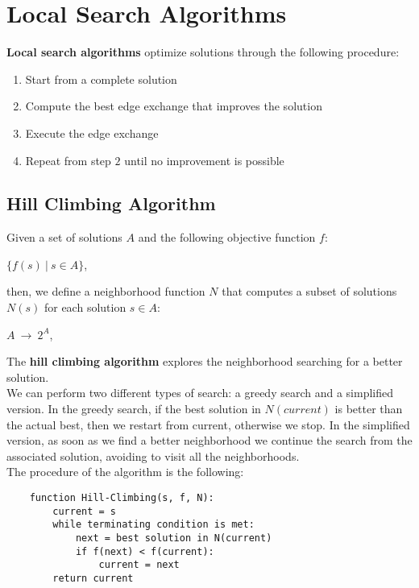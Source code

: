 \documentclass{article}
\begin{document}
\newpage

\section{Local Search Algorithms}
\textbf{Local search algorithms} optimize solutions through the following procedure:
\begin{enumerate}
    \item Start from a complete solution
    \item Compute the best edge exchange that improves the solution
    \item Execute the edge exchange
    \item Repeat from step $2$ until no improvement is possible
\end{enumerate}
\subsection{Hill Climbing Algorithm}
Given a set of solutions $A$ and the following objective function $f$:
\begin{center}
    $\{f(s) \ | \ s \in A \}$,
\end{center}
then, we define a neighborhood function $N$ that computes a subset of solutions $N(s)$ for each solution $s \in A$:
\begin{center}
    $A \ \rightarrow \ 2^A$,
\end{center}
The \textbf{hill climbing algorithm} explores the neighborhood searching for a better solution. \\
We can perform two different types of search: a greedy search and a simplified version. In the greedy search, if the best solution in $N(current)$ is better than the actual best, then we restart from current, otherwise we stop. In the simplified version, as soon as we find a better neighborhood we continue the search from the associated solution, avoiding to visit all the neighborhoods. \\
The procedure of the algorithm is the following:
\begin{verbatim}
    function Hill-Climbing(s, f, N):
        current = s
        while terminating condition is met:
            next = best solution in N(current)
            if f(next) < f(current):
                current = next
        return current
\end{verbatim}
\newpage
\end{document}
